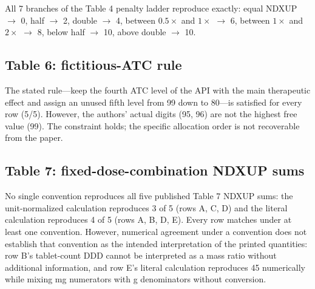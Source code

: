 \documentclass[a4paper]{elsarticle}
\begin{document}
All 7 branches of the Table 4 penalty ladder reproduce exactly: equal NDXUP $\to$ 0, half $\to$ 2, double $\to$ 4, between $0.5\times$ and $1\times$ $\to$ 6, between $1\times$ and $2\times$ $\to$ 8, below half $\to$ 10, above double $\to$ 10.

\subsection{Table 6: fictitious-ATC rule}
\label{sec:results-table6}

The stated rule---keep the fourth ATC level of the API with the main therapeutic effect and assign an unused fifth level from 99 down to 80---is satisfied for every row (5/5). However, the authors' actual digits (95, 96) are not the highest free value (99). The constraint holds; the specific allocation order is not recoverable from the paper.

\subsection{Table 7: fixed-dose-combination NDXUP sums}
\label{sec:results-table7}

\begin{table}[htbp]
\centering\small
\caption{Reproduction of the 5 published Table 7 NDXUP sums under two unit conventions. A row counts as reproduced when \emph{some} convention matches.}
\label{tab:table7}
\end{table}

No single convention reproduces all five published Table 7 NDXUP sums: the unit-normalized calculation reproduces 3 of 5 (rows A, C, D) and the literal calculation reproduces 4 of 5 (rows A, B, D, E). Every row matches under at least one convention. However, numerical agreement under a convention does not establish that convention as the intended interpretation of the printed quantities: row B's tablet-count DDD cannot be interpreted as a mass ratio without additional information, and row E's literal calculation reproduces 45 numerically while mixing mg numerators with g denominators without conversion.
\end{document}
